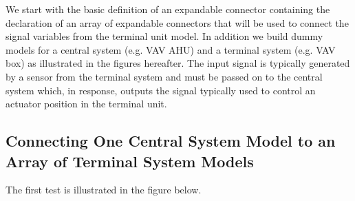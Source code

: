 \documentclass[letterpaper,10pt, openany,english]{sphinxmanual}
\begin{document}
We start with the basic definition of an expandable connector  containing the declaration of an array of expandable connectors  that will be used to connect the signal variables from the terminal unit model. In addition we build dummy models for a central system (e.g. VAV AHU) and a terminal system (e.g. VAV box) as illustrated in the figures hereafter. The input signal  is typically generated by a sensor from the terminal system and must be passed on to the central system which, in response, outputs the signal  typically used to control an actuator position in the terminal unit.

\begin{sphinxVerbatim}[commandchars=\\\{\}]
  
    
     
    \PYG{p}{[}\PYG{p}{]}     
 
\end{sphinxVerbatim}

\begin{figure}[htbp]
\centering

\noindent{}
\end{figure}

\begin{figure}[htbp]
\centering

\noindent{}
\end{figure}


\subsection{Connecting One Central System Model to an Array of Terminal System Models}
\label{\detokenize{annex:connecting-one-central-system-model-to-an-array-of-terminal-system-models}}
The first test is illustrated in the figure below.
\end{document}
